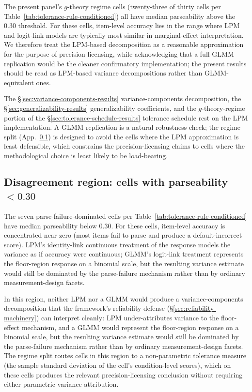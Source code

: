 \documentclass[11pt]{article}
\begin{document}
The present panel's $g$-theory regime cells (twenty-three of thirty cells per Table~\ref{tab:tolerance-rule-conditioned}) all have median parseability above the 0.30 threshold. For these cells, item-level accuracy lies in the range where LPM and logit-link models are typically most similar in marginal-effect interpretation. We therefore treat the LPM-based decomposition as a reasonable approximation for the purpose of precision licensing, while acknowledging that a full GLMM replication would be the cleaner confirmatory implementation; the present results should be read as LPM-based variance decompositions rather than GLMM-equivalent ones.

The §\ref{sec:variance-components-results} variance-components decomposition, the §\ref{sec:generalizability-results} generalizability coefficients, and the $g$-theory-regime portion of the §\ref{sec:tolerance-schedule-results} tolerance schedule rest on the LPM implementation. A GLMM replication is a natural robustness check; the regime split (App.~\ref{app:lpm-glmm-disagreement}) is designed to avoid the cells where the LPM approximation is least defensible, which constrains the precision-licensing claims to cells where the methodological choice is least likely to be load-bearing.

\subsection{Disagreement region: cells with parseability $< 0.30$}
\label{app:lpm-glmm-disagreement}

The seven parse-failure-dominated cells per Table~\ref{tab:tolerance-rule-conditioned} have median parseability below 0.30. For these cells, item-level accuracy is concentrated near zero (most items fail to parse and produce a default-incorrect score). LPM's identity-link continuous treatment of the response models the variance as if accuracy were continuous; GLMM's logit-link treatment represents the floor-region response on a binomial scale, but the resulting variance estimate would still be dominated by the parse-failure mechanism rather than by ordinary measurement-design facets.

In this region, neither LPM nor a GLMM would produce a variance-components decomposition that the framework's reliability defense (§\ref{sec:reliability-machinery}) can interpret cleanly: LPM under-attributes variance to the floor-effect mechanism, and a GLMM would represent the floor-region response on a binomial scale, but the resulting variance estimate would still be dominated by the parse-failure mechanism rather than by ordinary measurement-design facets. The regime split routes cells in this region to a non-parametric tolerance measure (the sample standard deviation of the cell's condition-level scores), which on these cells produces the relevant precision-licensing conclusion without requiring either parametric variance attribution.
\end{document}
